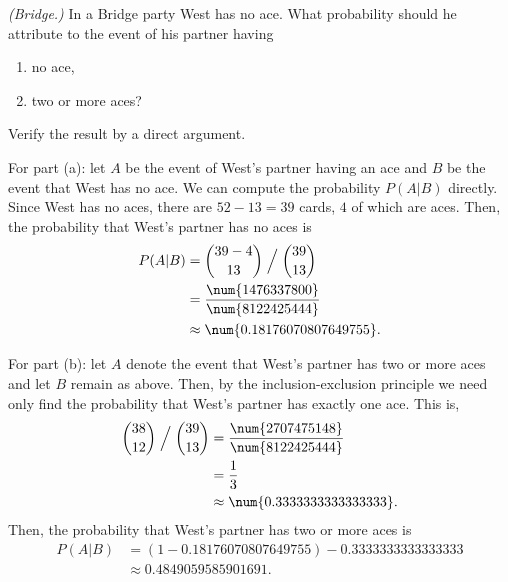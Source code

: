\begin{problem}[Handout 4, \# 10]
  \emph{(Bridge.)} In a Bridge party West has no ace. What probability
  should he attribute to the event of his partner having
  \begin{enumerate}[label=(\alph*),noitemsep]
  \item no ace,
  \item two or more aces?
  \end{enumerate}
  Verify the result by a direct argument.
\end{problem}
\begin{solution}
  For part (a): let \(A\) be the event of West's partner having an ace and
  \(B\) be the event that West has no ace. We can compute the probability
  \(P(A|B)\) directly. Since West has no aces, there are \(52-13=39\)
  cards, \(4\) of which are aces. Then, the probability that West's partner
  has no aces is
  \begin{align*}
    P(A|B)
    &=\binom{39-4}{13}\Bigm/\binom{39}{13}\\
    &=\frac{\num{1476337800}}{\num{8122425444}}\\
    &\approx\num{0.18176070807649755}.
  \end{align*}

  For part (b): let \(A\) denote the event that West's partner has two or
  more aces and let \(B\) remain as above. Then, by the inclusion-exclusion
  principle we need only find the probability that West's partner has
  exactly one ace. This is,
  \begin{align*}
    \binom{38}{12}\Bigm/\binom{39}{13}
    &=\frac{\num{2707475148}}{\num{8122425444}}\\
    &=\frac{1}{3}\\
    &\approx\num{0.3333333333333333}.
  \end{align*}
  Then, the probability that West's partner has two or more aces is
  \begin{align*}
    P(A|B)
    &=(1-\num{0.18176070807649755})-\num{0.3333333333333333}\\
    &\approx\num{0.4849059585901691}.
  \end{align*}
\end{solution}
\newpage

